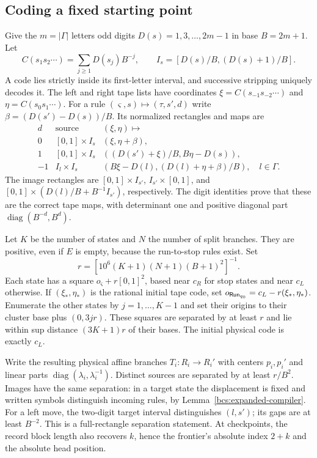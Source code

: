 \subsection{Coding a fixed starting point}
Give the $m=|\Gamma|$ letters odd digits $D(s)=1,3,\ldots,2m-1$ in base $B=2m+1$. Let
\[
 C(s_1s_2\cdots)=\sum_{j\ge1}D(s_j)B^{-j},\qquad
 I_s=[D(s)/B,(D(s)+1)/B].
\]
A code lies strictly inside its first-letter interval, and successive stripping uniquely decodes it. The left and right tape lists have coordinates $\xi=C(s_{-1}s_{-2}\cdots)$ and $\eta=C(s_0s_1\cdots)$. For a rule $(\varsigma,s)\mapsto(\tau,s',d)$ write $\beta=(D(s')-D(s))/B$. Its normalized rectangles and maps are
\begin{equation}\label{bcs:expanded-branches}
\begin{array}{ccl}
 d&\text{source}&(\xi,\eta)\longmapsto\\
 0&[0,1]\times I_s&(\xi,\eta+\beta),\\
 1&[0,1]\times I_s&((D(s')+\xi)/B,B\eta-D(s)),\\
 -1&I_l\times I_s&(B\xi-D(l),(D(l)+\eta+\beta)/B),\quad l\in\Gamma.
\end{array}
\end{equation}
The image rectangles are $[0,1]\times I_{s'}$, $I_{s'}\times[0,1]$, and $[0,1]\times(D(l)/B+B^{-1}I_{s'})$, respectively. The digit identities prove that these are the correct tape maps, with determinant one and positive diagonal part $\operatorname{diag}(B^{-d},B^d)$.

Let $K$ be the number of states and $N$ the number of split branches. They are positive, even if $E$ is empty, because the run-to-stop rules exist. Set
\[
 r=[10^6(K+1)(N+1)(B+1)^2]^{-1}.
\]
Each state has a square $o_\varsigma+r[0,1]^2$, based near $c_R$ for stop states and near $c_L$ otherwise. If $(\xi_*,\eta_*)$ is the rational initial tape code, set
$o_{{\sf Run}_{q_0}}=c_L-r(\xi_*,\eta_*)$.
Enumerate the other states by $j=1,\ldots,K-1$ and set their origins to their cluster base plus $(0,3jr)$. These squares are separated by at least $r$ and lie within sup distance $(3K+1)r$ of their bases. The initial physical code is exactly $c_L$.

Write the resulting physical affine branches $T_i:R_i\to R_i'$ with centers $p_i,p_i'$ and linear parts $\operatorname{diag}(\lambda_i,\lambda_i^{-1})$. Distinct sources are separated by at least $r/B^2$. Images have the same separation: in a target state the displacement is fixed and written symbols distinguish incoming rules, by Lemma~\ref{bcs:expanded-compiler}. For a left move, the two-digit target interval distinguishes $(l,s')$; its gaps are at least $B^{-2}$. This is a full-rectangle separation statement. At checkpoints, the record block length also recovers $k$, hence the frontier's absolute index $2+k$ and the absolute head position.

